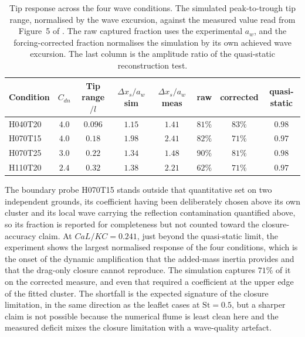 \begin{table}[!ht]
\centering
\small
\caption{Tip response across the four wave conditions. The simulated peak-to-trough tip range, normalised by the wave excursion, against the measured value read from Figure~5 of \citet{jacobsen_waveinduced_2019}. The raw captured fraction uses the experimental $a_w$, and the forcing-corrected fraction normalises the simulation by its own achieved wave excursion. The last column is the amplitude ratio of the quasi-static reconstruction test.}
\label{tab:flexveg_cond_metrics}
\setlength{\tabcolsep}{5pt}
\renewcommand{\arraystretch}{1.15}
\begin{tabular}{l c c c c c c c}
\toprule
Condition & $C_{dn}$ & Tip range$/l$ & $\Delta x_s/a_w$ sim & $\Delta x_s/a_w$ meas & raw & corrected & quasi-static \\
\midrule
H040T20 & $4.0$ & $0.096$ & $1.15$ & $1.41$ & $81\%$ & $83\%$ & $0.98$ \\
H070T15 & $4.0$ & $0.18$ & $1.98$ & $2.41$ & $82\%$ & $71\%$ & $0.97$ \\
H070T25 & $3.0$ & $0.22$ & $1.34$ & $1.48$ & $90\%$ & $81\%$ & $0.98$ \\
H110T20 & $2.4$ & $0.32$ & $1.38$ & $2.21$ & $62\%$ & $71\%$ & $0.97$ \\
\bottomrule
\end{tabular}
\end{table}

\noindent
The boundary probe H070T15 stands outside that quantitative set on two independent grounds, its coefficient having been deliberately chosen above its own cluster and its local wave carrying the reflection contamination quantified above, so its fraction is reported for completeness but not counted toward the closure-accuracy claim. At $CaL/KC = 0.241$, just beyond the quasi-static limit, the experiment shows the largest normalised response of the four conditions, which is the onset of the dynamic amplification that the added-mass inertia provides and that the drag-only closure cannot reproduce. The simulation captures $71\%$ of it on the corrected measure, and even that required a coefficient at the upper edge of the fitted cluster. The shortfall is the expected signature of the closure limitation, in the same direction as the leaflet cases at $\mathrm{St} = 0.5$, but a sharper claim is not possible because the numerical flume is least clean here and the measured deficit mixes the closure limitation with a wave-quality artefact.

